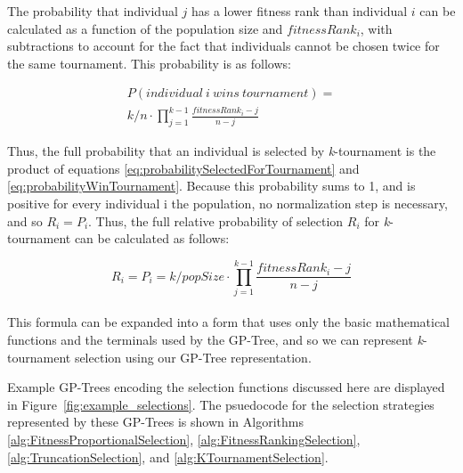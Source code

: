 \documentclass[sigconf]{acmart}
\begin{document}
The probability that individual $j$ has a lower fitness rank than individual $i$ can be calculated as a function of the population size and $fitnessRank_i$, with subtractions to account for the fact that individuals cannot be chosen twice for the same tournament. This probability is as follows:

\begin{equation} \label{eq:probabilityWinTournament}
\begin{split}
	P(individual\ i\ wins\ tournament) =\\ {k / n} \cdot \prod_{j=1}^{k-1} \frac{fitnessRank_i - j}{n - j}
\end{split}
\end{equation}

Thus, the full probability that an individual is selected by \textit{k}-tournament is the product of equations \ref{eq:probabilitySelectedForTournament} and \ref{eq:probabilityWinTournament}. Because this probability sums to 1, and is positive for every individual i the population, no normalization step is necessary, and so $R_i = P_i$. Thus, the full relative probability of selection $R_i$ for \textit{k}-tournament can be calculated as follows:

\begin{equation}
	R_i = P_i = {k / popSize} \cdot \prod_{j=1}^{k-1} \frac{fitnessRank_i - j}{n - j}
\end{equation}
\\

This formula can be expanded into a form that uses only the basic mathematical functions and the terminals used by the GP-Tree, and so we can represent \textit{k}-tournament selection using our GP-Tree representation.

Example GP-Trees encoding the selection functions discussed here are displayed in Figure~\ref{fig:example_selections}. The psuedocode for the selection strategies represented by these GP-Trees is shown in Algorithms \ref{alg:FitnessProportionalSelection}, \ref{alg:FitnessRankingSelection}, \ref{alg:TruncationSelection}, and \ref{alg:KTournamentSelection}.
\end{document}
